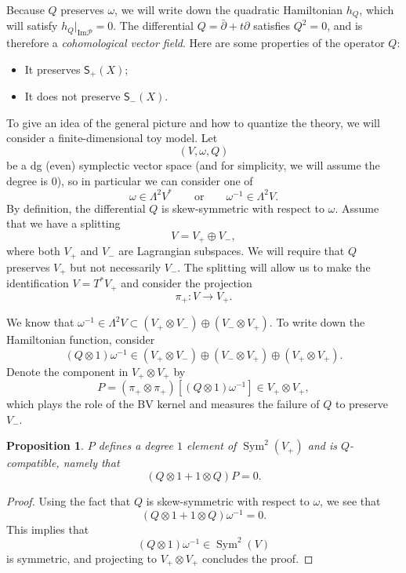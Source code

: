 \documentclass{amsart}
\newtheorem{prop}[thm]{Proposition}
\theoremstyle{definition}
\theoremstyle{remark}
\theoremstyle{plain}
\theoremstyle{definition}
\theoremstyle{remark}
\newcommand{\Ima}{\mathrm{Im}}
\newcommand{\mc}[1]{\mathcal{#1}}
\newcommand{\on}[1]{\operatorname{#1}}
\newcommand{\ms}[1]{\mathsf{#1}}
\newcommand{\1}{\mathbf{1}}
\newcommand{\2}{\mathbf{2}}
\newcommand{\3}{\mathbf{3}}
\newcommand{\dbar}{\bar{\partial}}
\begin{document}
Because \(Q\) preserves \(\omega\), we will write down the quadratic Hamiltonian \(h_Q\), which will satisfy \(h_Q|_{\Ima \mc{P}} = 0\). The differential \(Q = \dbar + t \partial\) satisfies \(Q^2 = 0\), and is therefore a \textit{cohomological vector field}. Here are some properties of the operator \(Q\):
\begin{itemize}
    \item It preserves \(\ms{S}_+(X)\);
    \item It does not preserve \(\ms{S}_-(X)\).
\end{itemize}

To give an idea of the general picture and how to quantize the theory, we will consider a finite-dimensional toy model. Let
\[ (V, \omega, Q) \]
be a dg (even) symplectic vector space (and for simplicity, we will assume the degree is \(0\)), so in particular we can consider one of
\[ \omega \in \Lambda^2 V^* \qquad \text{or} \qquad \omega^{-1} \in \Lambda^2 V. \]
By definition, the differential \(Q\) is skew-symmetric with respect to \(\omega\). Assume that we have a splitting
\[ V = V_+ \oplus V_-, \]
where both \(V_+\) and \(V_-\) are Lagrangian subspaces. We will require that \(Q\) preserves \(V_+\) but not necessarily \(V_-\). The splitting will allow us to make the identification \(V = T^* V_+\) and consider the projection
\[ \pi_+ \colon V \to V_+. \]

We know that \(\omega^{-1} \in \Lambda^2 V \subset (V_+ \otimes V_-) \oplus (V_- \otimes V_+)\). To write down the Hamiltonian function, consider
\[ (Q \otimes 1) \omega^{-1} \in (V_+ \otimes V_-) \oplus (V_- \otimes V_+) \oplus (V_+ \otimes V_+). \]
Denote the component in \(V_+ \otimes V_+\) by
\[ P = (\pi_+ \otimes \pi_+) [(Q \otimes 1) \omega^{-1}] \in V_+ \otimes V_+, \]
which plays the role of the BV kernel and measures the failure of \(Q\) to preserve \(V_-\).

\begin{prop}
    \(P\) defines a degree \(1\) element of \(\on{Sym}^2(V_+)\) and is \(Q\)-compatible, namely that
    \[ (Q \otimes 1 + 1 \otimes Q) P = 0. \]
\end{prop}

\begin{proof}
    Using the fact that \(Q\) is skew-symmetric with respect to \(\omega\), we see that
    \[ (Q \otimes 1 + 1 \otimes Q) \omega^{-1} = 0. \]
    This implies that
    \[ (Q \otimes 1) \omega^{-1} \in \on{Sym}^2(V) \]
    is symmetric, and projecting to \(V_+ \otimes V_+\) concludes the proof.
\end{proof}
\end{document}
